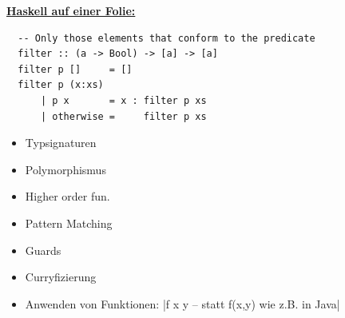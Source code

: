 \documentclass[unknownkeysallowed]{beamer}
\begin{document}
  
  \begin{frame}[fragile]
  
  \Large\textbf{\underline{Haskell auf einer Folie:}} \bigskip \normalsize

  \begin{verbatim}
  -- Only those elements that conform to the predicate
  filter :: (a -> Bool) -> [a] -> [a]
  filter p []     = []
  filter p (x:xs) 
      | p x       = x : filter p xs
      | otherwise =     filter p xs
  \end{verbatim}
  
  \pause
  
  \begin{multicols}{2}
  \begin{itemize}
  \item Typsignaturen    \pause
  \item Polymorphismus   \pause
  \item Higher order fun. \pause
  \end{itemize}
  
  \columnbreak
  
  \begin{itemize}
  \item Pattern Matching \pause
  \item Guards            \pause
  \item Curryfizierung    \pause
  \end{itemize}

  \end{multicols}

  \begin{itemize}
  \item Anwenden von Funktionen: |f x y -- statt f(x,y) wie z.B. in Java| 
  \end{itemize}
  
\end{frame}

\end{document}
